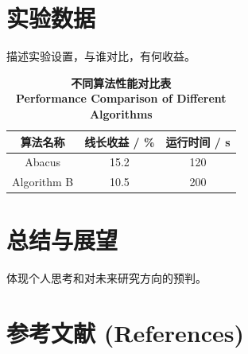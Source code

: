 \documentclass[12pt, a4paper]{article}
\newcommand{\xiaowu}{\fontsize{9pt}{13.5pt}\selectfont}   %
\begin{document}
\section{实验数据} %
描述实验设置，与谁对比，有何收益。

\begin{table}[htbp]
    \centering
    \caption{\textbf{不同算法性能对比表} \\ \textbf{Performance Comparison of Different Algorithms}}
    \begin{tabular}{ccc}
        \toprule
        算法名称 & 线长收益 / \% & 运行时间 / s \\
        \midrule
        Abacus & 15.2 & 120 \\
        Algorithm B & 10.5 & 200 \\
        \bottomrule
    \end{tabular}
\end{table}

\section{总结与展望} %
体现个人思考和对未来研究方向的预判。

\vspace{2em}

\section*{\xiaowu\heiti 参考文献 (References)}
\end{document}
